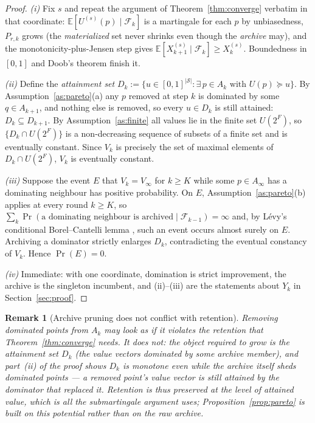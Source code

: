 \documentclass[11pt]{article}
\newtheorem{remark}{Remark}
\newcommand{\E}{\mathbb{E}}
\newcommand{\filt}{\mathcal{F}}     %
\begin{document}
\begin{proof}
\emph{(i)} Fix $s$ and repeat the argument of Theorem~\ref{thm:converge} verbatim in that coordinate: $\E[U^{(s)}(p)\mid\filt_k]$ is a martingale for each $p$ by unbiasedness, $P_{r,k}$ grows (the \emph{materialized} set never shrinks even though the \emph{archive} may), and the monotonicity-plus-Jensen step gives $\E[X^{(s)}_{k+1}\mid\filt_k]\ge X^{(s)}_k$. Boundedness in $[0,1]$ and Doob's theorem finish it.

\emph{(ii)} Define the \emph{attainment set} $D_k:=\{u\in[0,1]^{|\mathcal S|}:\exists\,p\in A_k \text{ with } U(p)\succeq u\}$. By Assumption~\ref{as:pareto}(a) any $p$ removed at step $k$ is dominated by some $q\in A_{k+1}$, and nothing else is removed, so every $u\in D_k$ is still attained: $D_k\subseteq D_{k+1}$. By Assumption~\ref{as:finite} all values lie in the finite set $U(2^F)$, so $\{D_k\cap U(2^F)\}$ is a non-decreasing sequence of subsets of a finite set and is eventually constant. Since $V_k$ is precisely the set of maximal elements of $D_k\cap U(2^F)$, $V_k$ is eventually constant.

\emph{(iii)} Suppose the event $E$ that $V_k=V_\infty$ for $k\ge K$ while some $p\in A_\infty$ has a dominating neighbour has positive probability. On $E$, Assumption~\ref{as:pareto}(b) applies at every round $k\ge K$, so $\sum_k\Pr(\text{a dominating neighbour is archived}\mid\filt_{k-1})=\infty$ and, by L\'evy's conditional Borel--Cantelli lemma \citep[Thm.~4.3.4]{durrett2019}, such an event occurs almost surely on $E$. Archiving a dominator strictly enlarges $D_k$, contradicting the eventual constancy of $V_k$. Hence $\Pr(E)=0$.

\emph{(iv)} Immediate: with one coordinate, domination is strict improvement, the archive is the singleton incumbent, and (ii)--(iii) are the statements about $Y_k$ in Section~\ref{sec:proof}.
\end{proof}

\begin{remark}[Archive pruning does not conflict with retention]
\label{rem:pareto-monotone}
Removing dominated points from $A_k$ may look as if it violates the retention that Theorem~\ref{thm:converge} needs. It does not: the object required to grow is the \emph{attainment set} $D_k$ (the value vectors dominated by some archive member), and part~(ii) of the proof shows $D_k$ is monotone even while the archive itself sheds dominated points --- a removed point's value vector is still attained by the dominator that replaced it. Retention is thus preserved at the level of \emph{attained value}, which is all the submartingale argument uses; Proposition~\ref{prop:pareto} is built on this potential rather than on the raw archive.
\end{remark}
\end{document}
